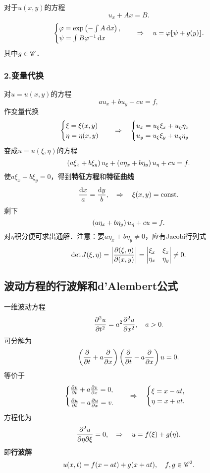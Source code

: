 对于$u(x,y)$的方程
\[
	u_x+Ax=B.
	\]
\begin{align*}
	\begin{cases}
		\varphi=\exp\kh{-\int A\d x},  \\
		\psi=\int B\varphi^{-1}\d x
	\end{cases}
	\thus u=\varphi\zkh{\psi+g(y)}.
\end{align*}
其中$g\in\sC$．
\subsubsection*{2.变量代换}
对$u=u(x,y)$的方程
\[
	au_x+bu_y+cu=f,
	\]
作变量代换
\begin{align*}
	\begin{cases}
		\xi=\xi(x,y)  \\
		\eta=\eta(x,y)
	\end{cases}
	\thus
	\begin{cases}
		u_x=u_\xi\xi_x+u_\eta\eta_x \\
		u_y=u_\xi\xi_y+u_\eta\eta_y
	\end{cases}
\end{align*}
变成$u=u(\xi,\eta)$的方程
\[
	\kh{a\xi_x+b\xi_y}u_\xi+\kh{a\eta_x+b\eta_y}u_\eta+cu=f.
	\]
使$a\xi_x+b\xi_y=0$，得到\textbf{特征方程}和\textbf{特征曲线}
\begin{align}
	\frac{\d x}a=\frac{\d y}b,\thus\xi(x,y)=\cns.
\end{align}
剩下
\[
	\kh{a\eta_x+b\eta_y}u_\eta+cu=f.
	\]
对$\eta$积分便可求出通解．注意：要$a\eta_x+b\eta_y\neq 0$，应有Jacobi行列式
\begin{align*}
	\det J(\xi,\eta)=\left\lvert\frac{\p(\xi,\eta)}{\p(x,y)}\right\rvert=
	\begin{vmatrix}
		\xi_x  & \xi_x  \\
		\eta_x & \eta_y
	\end{vmatrix}\neq 0.
\end{align*}
\subsection{波动方程的行波解和d'Alembert公式}
一维波动方程
\[
	\pv[2]ut=a^2\pv[2]ux,\quad a>0.
	\]
可分解为
\[
	\kh{\pp t+a\pp x}\kh{\pp t-a\pp x}u=0.
	\]
等价于
\begin{align*}
	\begin{cases}
		\pv vt+a\pv vx=0, \\[1ex]
		\pv ut-a\pv ux=v.
	\end{cases}
	\thus
	\begin{cases}
		\xi=x-at, \\
		\eta=x+at.
	\end{cases}
\end{align*}
方程化为
\[\pw u\eta\xi=0,\thus u=f(\xi)+g(\eta).\]
即\textbf{行波解}
\begin{align}
	u(x,t)=f(x-at)+g(x+at),\quad f,g\in\sC^2.
\end{align}
